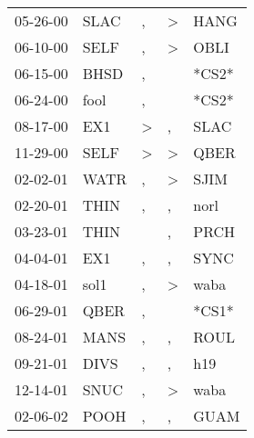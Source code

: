 \begin{supertabular}{p{0.07\textwidth}p{0.06\textwidth}p{0.02\textwidth}p{0.02\textwidth}p{0.06\textwidth}}
 05-26-00\textsuperscript{} &  SLAC\textsuperscript{} &             , &  \textgreater &  HANG\textsuperscript{} \\
 06-10-00\textsuperscript{} &  SELF\textsuperscript{} &             , &  \textgreater &  OBLI\textsuperscript{} \\
 06-15-00\textsuperscript{} &  BHSD\textsuperscript{} &             , &               &                   *CS2* \\
 06-24-00\textsuperscript{} &  fool\textsuperscript{} &             , &               &                   *CS2* \\
 08-17-00\textsuperscript{} &   EX1\textsuperscript{} &  \textgreater &             , &  SLAC\textsuperscript{} \\
 11-29-00\textsuperscript{} &  SELF\textsuperscript{} &  \textgreater &  \textgreater &  QBER\textsuperscript{} \\
 02-02-01\textsuperscript{} &  WATR\textsuperscript{} &             , &  \textgreater &  SJIM\textsuperscript{} \\
 02-20-01\textsuperscript{} &  THIN\textsuperscript{} &             , &             , &  norl\textsuperscript{} \\
 03-23-01\textsuperscript{} &  THIN\textsuperscript{} &               &             , &  PRCH\textsuperscript{} \\
 04-04-01\textsuperscript{} &   EX1\textsuperscript{} &             , &             , &  SYNC\textsuperscript{} \\
 04-18-01\textsuperscript{} &  sol1\textsuperscript{} &             , &  \textgreater &  waba\textsuperscript{} \\
 06-29-01\textsuperscript{} &  QBER\textsuperscript{} &             , &               &                   *CS1* \\
 08-24-01\textsuperscript{} &  MANS\textsuperscript{} &             , &             , &  ROUL\textsuperscript{} \\
 09-21-01\textsuperscript{} &  DIVS\textsuperscript{} &             , &             , &   h19\textsuperscript{} \\
 12-14-01\textsuperscript{} &  SNUC\textsuperscript{} &             , &  \textgreater &  waba\textsuperscript{} \\
 02-06-02\textsuperscript{} &  POOH\textsuperscript{} &             , &             , &  GUAM\textsuperscript{} \\

\end{supertabular}
